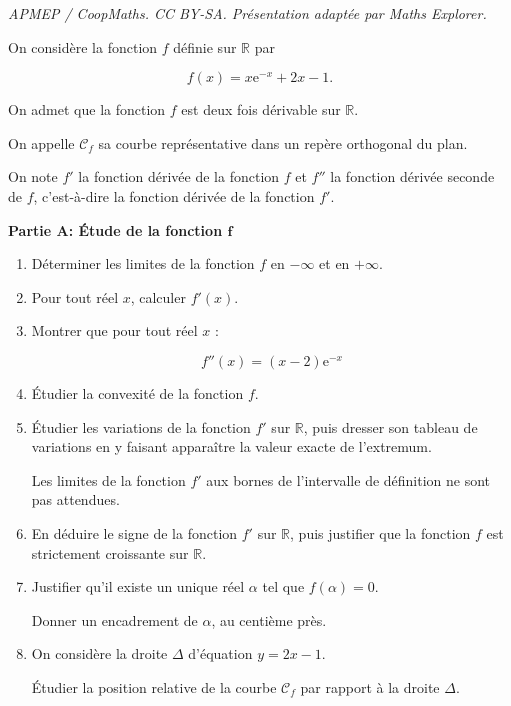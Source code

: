 \documentclass[10pt]{article}
\providecommand{\R}{\mathbb{R}}
\providecommand{\e}{{\mathrm{e}}}
\begin{document}
\noindent\textit{APMEP / CoopMaths. CC BY-SA. Présentation adaptée par Maths Explorer.}\par\medskip
\medskip

On considère la fonction $f$ définie sur $\R$ par 

\[f(x)=x \e^{-x}+2 x-1.\]

On admet que la fonction $f$ est deux fois dérivable sur $\R$.

On appelle $\mathcal{C}_{f}$ sa courbe représentative dans un repère orthogonal du plan.

	On note $f'$ la fonction dérivée de la fonction $f$ et $f''$ la fonction dérivée seconde de $f$, c'est-à-dire la fonction dérivée de la fonction $f'$.

\bigskip

\textbf{Partie A: Étude de la fonction $\boldsymbol{f}$}

\medskip

\begin{enumerate}
\item Déterminer les limites de la fonction $f$ en $-\infty$ et en $+\infty$.
\item Pour tout réel $x$, calculer $f'(x)$.
\item Montrer que pour tout réel $x$ :

\[f''(x)= (x-2) \e^{-x}\]

\item Étudier la convexité de la fonction $f$.

\item Étudier les variations de la fonction $f'$ sur $\R$, puis dresser son tableau de variations en y faisant apparaître la valeur exacte de l'extremum.

Les limites de la fonction $f'$ aux bornes de l'intervalle de définition ne sont pas attendues.

\item En déduire le signe de la fonction $f'$ sur $\R$, puis justifier que la fonction $f$ est strictement croissante sur $\R$.
\item Justifier qu'il existe un unique réel $\alpha$ tel que $f(\alpha)=0$.

Donner un encadrement de $\alpha$, au centième près.
\item On considère la droite $\Delta$ d'équation $y=2 x-1$.

Étudier la position relative de la courbe $\mathcal{C}_{f}$ par rapport à la droite $\Delta$.
\end{enumerate}
\end{document}
